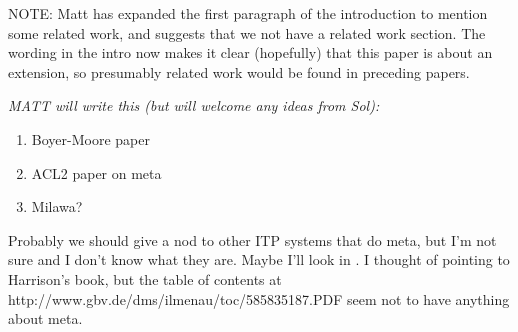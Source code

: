 NOTE: Matt has expanded the first paragraph of the introduction to
mention some related work, and suggests that we not have a related
work section.  The wording in the intro now makes it clear (hopefully)
that this paper is about an extension, so presumably related work
would be found in preceding papers.

{\it \color{red} MATT will write this (but will welcome any ideas from
  Sol):

\begin{enumerate}

\item Boyer-Moore paper~\cite{meta}
\item ACL2 paper on meta~\cite{meta-05}
\item Milawa?~\cite{davis09}

\end{enumerate}

Probably we should give a nod to other ITP systems that do meta, but
I'm not sure and I don't know what they are.  Maybe I'll look in
\cite{meta-05}.  I thought of pointing to Harrison's book, but the
table of contents at http://www.gbv.de/dms/ilmenau/toc/585835187.PDF
seem not to have anything about meta.


}
